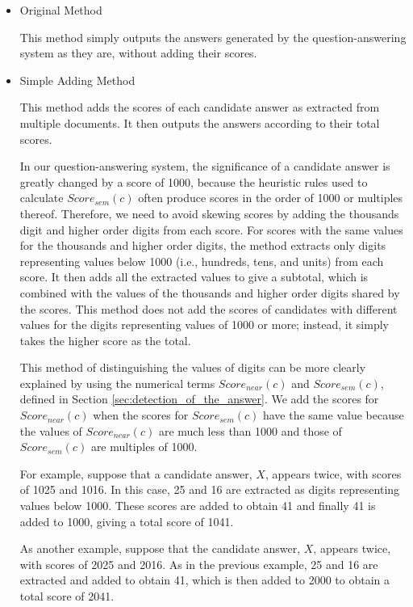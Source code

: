 \begin{itemize}
\item 
  Original Method

  This method simply outputs the answers generated by the question-answering system as they are, 
  without adding their scores. 
  
\item   
  Simple Adding Method
  
  This method adds the scores of each candidate answer
  as extracted from multiple documents. 
  It then outputs the answers according to their total scores. 

  In our question-answering system, 
  the significance of a candidate answer is greatly changed 
  by a score of 1000, because 
  the heuristic rules used to calculate $Score_{sem}(c)$ often produce scores in the order of 1000 or multiples thereof. 
  Therefore, we need to avoid skewing scores by adding the thousands digit and higher order digits 
  from each score. 
  For scores with the same values for the thousands and higher order digits, 
  the method extracts only digits 
  representing values below 1000 (i.e., hundreds, tens, and units) from each score. 
  It then adds all the extracted values to give a subtotal, which is 
  combined with the values of the thousands and higher order digits shared by the scores. 
  This method does not add the scores of candidates 
  with different values for the digits representing values of 1000 or more;
  instead, it simply takes the higher score as the total. 

  This method 
  of distinguishing the values of digits
  can be more clearly explained 
  by using the numerical terms $Score_{near}(c)$ and $Score_{sem}(c)$, defined in Section \ref{sec:detection_of_the_answer}. 
  We add the scores for $Score_{near}(c)$ 
  when the scores for $Score_{sem}(c)$ have the same value 
  because the values of $Score_{near}(c)$ are much less than 1000 and 
  those of $Score_{sem}(c)$ are multiples of 1000.

  For example, suppose that a candidate answer, $X$, appears twice, 
  with scores of 1025 and 1016. In this case, 25 and 16 are extracted 
  as digits representing values below 1000. These scores are added to obtain 41
  and finally 41 is added to 1000, giving a total score of 1041. 

  As another example, suppose that the candidate answer, $X$, appears twice, 
  with scores of 2025 and 2016. As in the previous example, 25 and 16 are extracted 
  and added to obtain 41, which is then added to 2000 to obtain a total score of 2041. 


\end{itemize}
